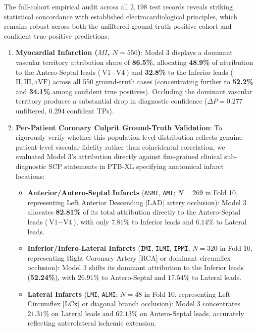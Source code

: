 \documentclass[5p,twocolumn,10pt]{elsarticle}
\begin{document}
The full-cohort empirical audit across all $2,198$ test records reveals striking statistical concordance with established electrocardiological principles, which remains robust across both the unfiltered ground-truth positive cohort and confident true-positive predictions:
\begin{enumerate}
    \item \textbf{Myocardial Infarction ($MI$, $N=550$)}: Model 3 displays a dominant vascular territory attribution share of \textbf{86.5\%}, allocating \textbf{48.9\%} of attribution to the Antero-Septal leads ($\text{V1}-\text{V4}$) and \textbf{32.8\%} to the Inferior leads ($\text{II}, \text{III}, \text{aVF}$) across all 550 ground-truth cases (concentrating further to \textbf{52.2\%} and \textbf{34.1\%} among confident true positives). Occluding the dominant vascular territory produces a substantial drop in diagnostic confidence ($\Delta P = 0.277$ unfiltered, $0.294$ confident TPs).
    \item \textbf{Per-Patient Coronary Culprit Ground-Truth Validation}: To rigorously verify whether this population-level distribution reflects genuine patient-level vascular fidelity rather than coincidental correlation, we evaluated Model 3's attribution directly against fine-grained clinical sub-diagnostic SCP statements in PTB-XL specifying anatomical infarct locations:
    \begin{itemize}
        \item \textbf{Anterior/Antero-Septal Infarcts} (\texttt{ASMI}, \texttt{AMI}; $N=269$ in Fold 10, representing Left Anterior Descending [LAD] artery occlusion): Model 3 allocates \textbf{82.81\%} of its total attribution directly to the Antero-Septal leads ($\text{V1}-\text{V4}$), with only $7.81\%$ to Inferior leads and $6.14\%$ to Lateral leads.
        \item \textbf{Inferior/Infero-Lateral Infarcts} (\texttt{IMI}, \texttt{ILMI}, \texttt{IPMI}; $N=320$ in Fold 10, representing Right Coronary Artery [RCA] or dominant circumflex occlusion): Model 3 shifts its dominant attribution to the Inferior leads (\textbf{52.24\%}), with $26.91\%$ to Antero-Septal and $17.54\%$ to Lateral leads.
        \item \textbf{Lateral Infarcts} (\texttt{LMI}, \texttt{ALMI}; $N=48$ in Fold 10, representing Left Circumflex [LCx] or diagonal branch occlusion): Model 3 concentrates $21.31\%$ on Lateral leads and $62.13\%$ on Antero-Septal leads, accurately reflecting anterolateral ischemic extension.
    \end{itemize}

\end{enumerate}
\end{document}
